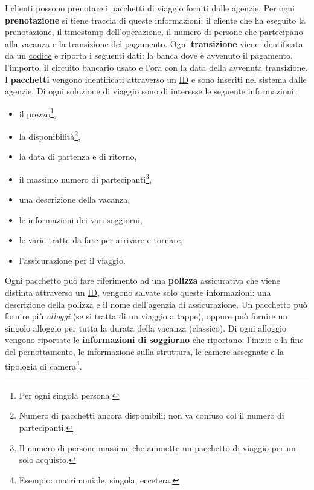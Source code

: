 %
%
I clienti possono prenotare i pacchetti di viaggio forniti dalle agenzie. Per ogni \textbf{prenotazione} si tiene traccia di queste informazioni: il cliente che ha eseguito la prenotazione, il timestamp dell'operazione, il numero di persone che partecipano alla vacanza e la transizione del pagamento.
%
%
Ogni \textbf{transizione} viene identificata da un \underline{codice} e riporta i seguenti dati: la banca dove è avvenuto il pagamento, l'importo, il circuito bancario usato e l'ora con la data della avvenuta transizione.
%
%
I \textbf{pacchetti} vengono identificati attraverso un \underline{ID} e sono inseriti nel sistema dalle agenzie. Di ogni soluzione di viaggio sono di interesse le seguente informazioni:
\begin{multicols}{3}
\begin{itemize}
    \item il prezzo\footnote{Per ogni singola persona.},
    \item la disponibilità\footnote{Numero di pacchetti ancora disponibili; non va confuso col il numero di partecipanti.},
    \item la data di partenza e di ritorno,
    \item il massimo numero di partecipanti\footnote{Il numero di persone massime che ammette un pacchetto di viaggio per un solo acquisto.},
    \item una descrizione della vacanza,
    \item le informazioni dei vari soggiorni,
    \item le varie tratte da fare per arrivare e tornare,
    \item l'assicurazione per il viaggio.
\end{itemize}
\end{multicols}
Ogni pacchetto può fare riferimento ad una \textbf{polizza} assicurativa che viene distinta attraverso un \underline{ID}, vengono salvate solo queste informazioni: una descrizione della polizza e il nome dell'agenzia di assicurazione.
%
%
Un pacchetto può fornire più \emph{alloggi} (se si tratta di un viaggio a tappe), oppure può fornire un singolo alloggio per tutta la durata della vacanza (classico). Di ogni alloggio vengono riportate le \textbf{informazioni di soggiorno} che riportano: l'inizio e la fine del pernottamento, le informazione sulla struttura, le camere assegnate e la tipologia di camera\footnote{Esempio: matrimoniale, singola, eccetera.}. 

